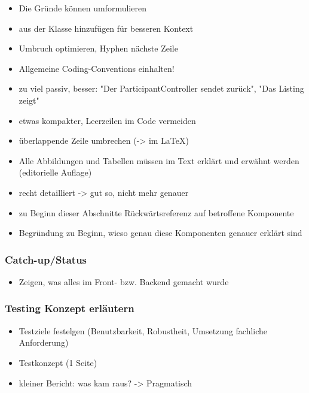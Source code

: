 \begin{itemize}

\item
  \grqq Die Gründe können\grqq{} umformulieren
\item
  \grqqAusschnitt aus der Klasse\grqq{} hinzufügen für besseren Kontext
\item
  Umbruch optimieren, Hyphen nächste Zeile
\item
  Allgemeine Coding-Conventions einhalten!
\item
  zu viel passiv, besser: "Der ParticipantController sendet zurück",
  "Das Listing zeigt"
\item
  etwas kompakter, Leerzeilen im Code vermeiden
\item
  überlappende Zeile umbrechen (-\textgreater{} im LaTeX)
\item
  Alle Abbildungen und Tabellen müssen im Text erklärt und erwähnt
  werden (editorielle Auflage)
\item
  recht detailliert -\textgreater{} gut so, nicht mehr genauer
\item
  zu Beginn dieser Abschnitte Rückwärtsreferenz auf betroffene
  Komponente
\item
  Begründung zu Beginn, wieso genau diese Komponenten genauer erklärt
  sind
\end{itemize}

\hypertarget{catch-upux2fstatus}{%
\subsubsection*{Catch-up/Status}\label{catch-upux2fstatus}}

\begin{itemize}

\item
  Zeigen, was alles im Front- bzw. Backend gemacht wurde
\end{itemize}

\hypertarget{testing-konzept-erlautern}{%
\subsubsection*{Testing Konzept
erläutern}\label{testing-konzept-erlautern}}

\begin{itemize}

\item
  Testziele festelgen (Benutzbarkeit, Robustheit, Umsetzung fachliche
  Anforderung)
\item
  Testkonzept (1 Seite)
\item
  kleiner Bericht: was kam raus? -\textgreater{} Pragmatisch
\end{itemize}

